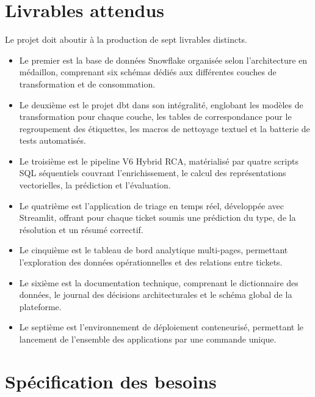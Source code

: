 \section{Livrables attendus}
Le projet doit aboutir à la production de sept livrables distincts.
\begin{itemize}
    \item Le premier est la base de données Snowflake organisée selon l'architecture en médaillon, comprenant six schémas dédiés aux différentes couches de transformation et de consommation.
    \item Le deuxième est le projet dbt dans son intégralité, englobant les modèles de transformation pour chaque couche, les tables de correspondance pour le regroupement des étiquettes, les macros de nettoyage textuel et la batterie de tests automatisés.
    \item Le troisième est le pipeline V6 Hybrid RCA, matérialisé par quatre scripts SQL séquentiels couvrant l'enrichissement, le calcul des représentations vectorielles, la prédiction et l'évaluation.
    \item Le quatrième est l'application de triage en temps réel, développée avec Streamlit, offrant pour chaque ticket soumis une prédiction du type, de la résolution et un résumé correctif.
    \item Le cinquième est le tableau de bord analytique multi-pages, permettant l'exploration des données opérationnelles et des relations entre tickets.
    \item Le sixième est la documentation technique, comprenant le dictionnaire des données, le journal des décisions architecturales et le schéma global de la plateforme.
    \item Le septième est l'environnement de déploiement conteneurisé, permettant le lancement de l'ensemble des applications par une commande unique.
\end{itemize}

\section{Spécification des besoins}
